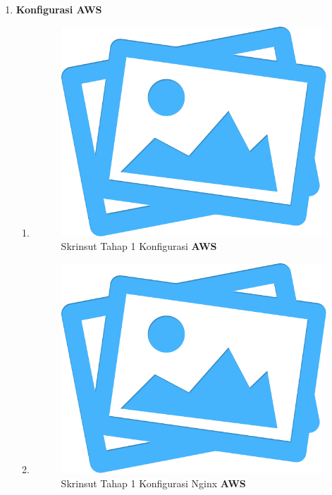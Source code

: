 \begin{enumerate}[label={}]
\begin{enumerate}[label=\roman*]
			\end{enumerate}
		\item 
		\textbf{Konfigurasi \textbf{AWS}}
		\begin{enumerate}[label=\roman*]
			\item \mylipsum
			\begin{figure}[H]
				\centering
				\includegraphics[width=0.4\textheight]{images/no-image.png}
				\caption{Skrinsut Tahap 1 Konfigurasi \textbf{AWS}}
				\label{pdm-final}
			\end{figure}					
			\item \mylipsum
			\begin{figure}[H]
				\centering
				\includegraphics[width=0.4\textheight]{images/no-image.png}
				\caption{Skrinsut Tahap 1 Konfigurasi Nginx \textbf{AWS}}
				\label{pdm-final}
			\end{figure}	
	 	\end{enumerate}
	\end{enumerate}